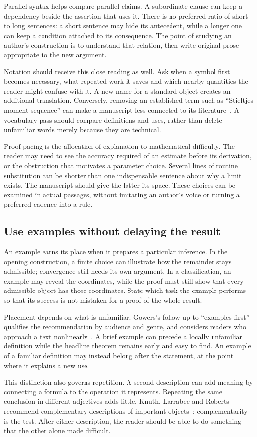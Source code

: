 Parallel syntax helps compare parallel claims. A subordinate clause can keep
a dependency beside the assertion that uses it. There is no preferred ratio
of short to long sentences: a short sentence may hide its antecedent, while
a longer one can keep a condition attached to its consequence. The point of
studying an author's construction is to understand that relation, then write
original prose appropriate to the new argument.

Notation should receive this close reading as well. Ask when a symbol first
becomes necessary, what repeated work it saves and which nearby quantities
the reader might confuse with it. A new name for a standard object creates an
additional translation. Conversely, removing an established term such as
``Stieltjes moment sequence'' can make a manuscript less connected to its
literature~\cite{wangzhu}. A vocabulary pass should compare definitions and
uses, rather than delete unfamiliar words merely because they are technical.

Proof pacing is the allocation of explanation to mathematical difficulty.
The reader may need to see the accuracy required of an estimate before its
derivation, or the obstruction that motivates a parameter choice. Several
lines of routine substitution can be shorter than one indispensable sentence
about why a limit exists. The manuscript should give the latter its space.
These choices can be examined in actual passages, without imitating an
author's voice or turning a preferred cadence into a rule.

\subsection{Use examples without delaying the result}

An example earns its place when it prepares a particular inference. In the
opening construction, a finite choice can illustrate how the remainder stays
admissible; convergence still needs its own argument. In a classification,
an example may reveal the coordinates, while the proof must still show that
every admissible object has those coordinates. State which task the example
performs so that its success is not mistaken for a proof of the whole result.

Placement depends on what is unfamiliar. Gowers's follow-up to ``examples
first'' qualifies the recommendation by audience and genre, and considers
readers who approach a text nonlinearly~\cite{gowers-followup}. A brief example
can precede a locally unfamiliar definition while the headline theorem remains
early and easy to find. An example of a familiar definition may instead belong
after the statement, at the point where it explains a new use.

This distinction also governs repetition. A second description can add meaning
by connecting a formula to the operation it represents. Repeating the same
conclusion in different adjectives adds little. Knuth, Larrabee and Roberts
recommend complementary descriptions of important objects~\cite[\S1, item~11]{knuth};
complementarity is the test. After either description, the reader should be able
to do something that the other alone made difficult.
